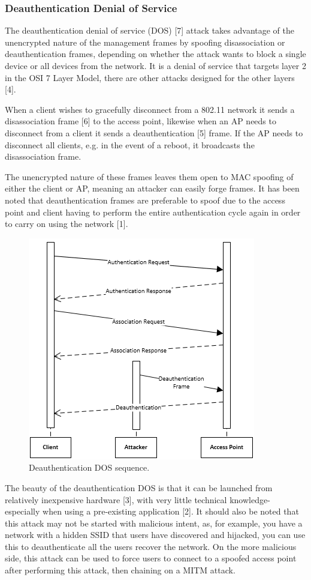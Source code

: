 \subsubsection{Deauthentication Denial of Service}
The deauthentication denial of service (DOS) [7] attack takes advantage of the unencrypted nature of the management frames by spoofing disassociation or deauthentication frames, depending on whether the attack wants to block a single device or all devices from the network. It is a denial of service that targets layer 2 in the OSI 7 Layer Model, there are other attacks designed for the other layers [4].

When a client wishes to gracefully disconnect from a 802.11 network it sends a disassociation frame [6] to the access point, likewise when an AP needs to disconnect from a client it sends a deauthentication [5] frame. If the AP needs to disconnect all clients, e.g. in the event of a reboot, it broadcasts the disassociation frame. 

The unencrypted nature of these frames leaves them open to MAC spoofing of either the client or AP, meaning an attacker can easily forge frames. It has been noted that deauthentication frames are preferable to spoof due to the access point and client having to perform the entire authentication cycle again in order to carry on using the network [1].

\begin{figure}[htbp!]
\centering\includegraphics{research/attackvectors/figures/ddos.png}
\caption{Deauthentication DOS sequence.}
\end{figure}

The beauty of the deauthentication DOS is that it can be launched from relatively inexpensive hardware [3], with very little technical knowledge- especially when using a pre-existing application [2]. It should also be noted that this attack may not be started with malicious intent, as, for example, you have a network with a hidden SSID that users have discovered and hijacked, you can use this to deauthenticate all the users recover the network. On the more malicious side, this attack can be used to force users to connect to a spoofed access point after performing this attack, then chaining on a MITM attack.

